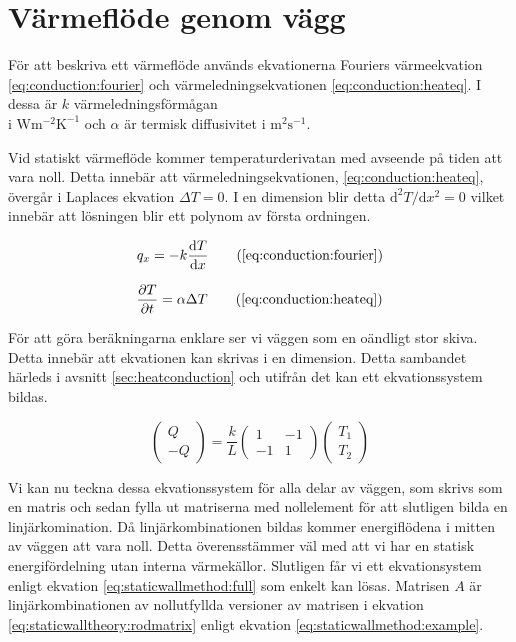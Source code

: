 \section{Värmeflöde genom vägg}

För att beskriva ett värmeflöde används ekvationerna Fouriers värmeekvation
\eqref{eq:conduction:fourier} och värmeledningsekvationen 
\eqref{eq:conduction:heateq}. 
I dessa är
$k$ värmeledningsförmågan\\i $\mbox{W}\mbox{m}^{-2}\mbox{K}^{-1}$ och
$\alpha$ är termisk diffusivitet i $\mbox{m}^2\mbox{s}^{-1}$. \cite{physicshandbook}

Vid statiskt värmeflöde kommer temperaturderivatan med avseende på tiden att vara noll. Detta innebär att värmeledningsekvationen, \eqref{eq:conduction:heateq}, övergår i Laplaces ekvation $\Delta T = 0$. I en dimension blir detta $\mathrm{d}
^2T/\mathrm{d} x^2 = 0$ vilket innebär att lösningen blir ett polynom av första ordningen. 

\begin{equation}
q_x = -k \frac{\mathrm{d}T}{\mathrm{d}x}
\tag{\ref{eq:conduction:fourier}}
\end{equation}

\begin{equation}
\frac{\partial T}{\partial t} = \alpha \Delta T
\tag{\ref{eq:conduction:heateq}}
\end{equation}

\noindent
För att göra beräkningarna enklare ser vi väggen som en oändligt stor skiva. Detta innebär att ekvationen kan skrivas i en dimension. Detta sambandet härleds i avsnitt \ref{sec:heatconduction} och utifrån det kan ett ekvationssystem bildas.

\begin{equation}
\label{eq:staticwalltheory:rodmatrix}
\begin{pmatrix}
Q \\
-Q
\end{pmatrix} = 
\frac{k}{L}\begin{pmatrix}
1 & -1 \\
-1 & 1
\end{pmatrix}
\begin{pmatrix}
T_1 \\
T_2
\end{pmatrix}
\end{equation}

\noindent
Vi kan nu teckna dessa ekvationssystem för alla delar av väggen, som skrivs som 
en matris och sedan fylla ut matriserna med nollelement för att slutligen bilda 
en linjärkomination.
Då linjärkombinationen bildas kommer energiflödena i mitten av väggen att
vara noll. Detta överensstämmer väl med att vi har en statisk energifördelning
utan interna värmekällor.
Slutligen får vi ett ekvationsystem enligt ekvation
\eqref{eq:staticwallmethod:full} som enkelt kan lösas.
Matrisen $A$ är linjärkombinationen av nollutfyllda versioner av matrisen i ekvation
\eqref{eq:staticwalltheory:rodmatrix} enligt ekvation
\eqref{eq:staticwallmethod:example}.

